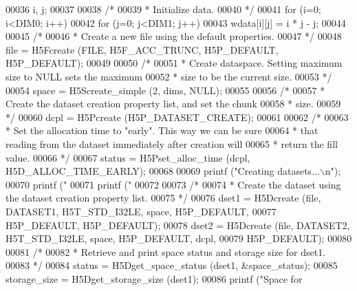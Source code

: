 \begin{DoxyCode}
00036                             i, j;
00037 
00038     \textcolor{comment}{/*}
00039 \textcolor{comment}{     * Initialize data.}
00040 \textcolor{comment}{     */}
00041     \textcolor{keywordflow}{for} (i=0; i<DIM0; i++)
00042         \textcolor{keywordflow}{for} (j=0; j<DIM1; j++)
00043             wdata[i][j] = i * j - j;
00044 
00045     \textcolor{comment}{/*}
00046 \textcolor{comment}{     * Create a new file using the default properties.}
00047 \textcolor{comment}{     */}
00048     file = H5Fcreate (FILE, H5F\_ACC\_TRUNC, H5P\_DEFAULT, H5P\_DEFAULT);
00049 
00050     \textcolor{comment}{/*}
00051 \textcolor{comment}{     * Create dataspace.  Setting maximum size to NULL sets the maximum}
00052 \textcolor{comment}{     * size to be the current size.}
00053 \textcolor{comment}{     */}
00054     space = H5Screate\_simple (2, dims, NULL);
00055 
00056     \textcolor{comment}{/*}
00057 \textcolor{comment}{     * Create the dataset creation property list, and set the chunk}
00058 \textcolor{comment}{     * size.}
00059 \textcolor{comment}{     */}
00060     dcpl = H5Pcreate (H5P\_DATASET\_CREATE);
00061 
00062     \textcolor{comment}{/*}
00063 \textcolor{comment}{     * Set the allocation time to "early".  This way we can be sure}
00064 \textcolor{comment}{     * that reading from the dataset immediately after creation will}
00065 \textcolor{comment}{     * return the fill value.}
00066 \textcolor{comment}{     */}
00067     status = H5Pset\_alloc\_time (dcpl, H5D\_ALLOC\_TIME\_EARLY);
00068 
00069     printf (\textcolor{stringliteral}{"Creating datasets...\(\backslash\)n"});
00070     printf (\textcolor{stringliteral}{"%
00071     printf (\textcolor{stringliteral}{"%
00072 
00073     \textcolor{comment}{/*}
00074 \textcolor{comment}{     * Create the dataset using the dataset creation property list.}
00075 \textcolor{comment}{     */}
00076     dset1 = H5Dcreate (file, DATASET1, H5T\_STD\_I32LE, space, H5P\_DEFAULT,
00077                 H5P\_DEFAULT, H5P\_DEFAULT);
00078     dset2 = H5Dcreate (file, DATASET2, H5T\_STD\_I32LE, space, H5P\_DEFAULT, dcpl,
00079                 H5P\_DEFAULT);
00080 
00081     \textcolor{comment}{/*}
00082 \textcolor{comment}{     * Retrieve and print space status and storage size for dset1.}
00083 \textcolor{comment}{     */}
00084     status = H5Dget\_space\_status (dset1, &space\_status);
00085     storage\_size = H5Dget\_storage\_size (dset1);
00086     printf (\textcolor{stringliteral}{"Space for %
}}}
\end{DoxyCode}
